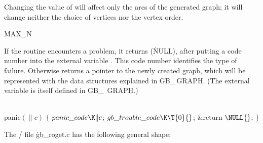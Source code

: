 Changing the value of  will affect only the arcs of the
generated graph; it will change neither the choice of vertices
nor the vertex order.

\Y\B\4\D\.{MAX\_N}\5
\par
\fi

If the  routine encounters a problem, it returns \PB{$%
\NULL$}
(\.{NULL}), after putting a code number into the external variable
. This code number identifies the type of failure.
Otherwise  returns a pointer to the newly created graph, which
will be represented with the data structures explained in {\sc GB\_\,GRAPH}.
(The external variable  is itself defined in {\sc GB\_%
\,GRAPH}.)

\Y\B\4\D\\{panic}$(\|c)$\5
${}\{{}$\5
\1${}\\{panic\_code}\K\|c{}$;\5
${}\\{gb\_trouble\_code}\K\T{0}{}$;\5
\&{return} ${}\NULL{}$;\5
${}\}{}$\2\par
\fi

The \CEE/ file \.{gb\_roget.c} has the following general shape:

